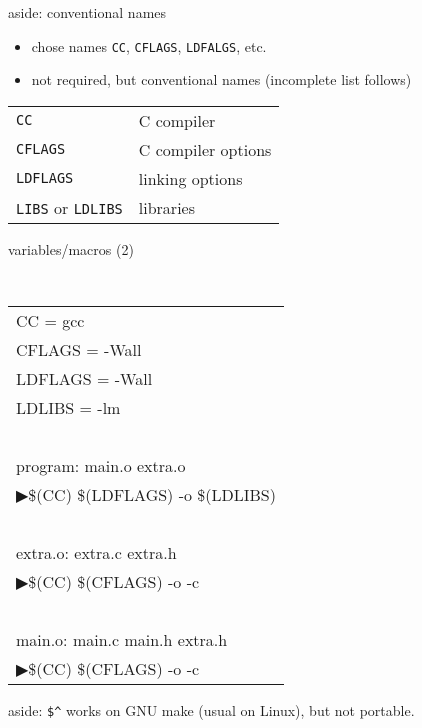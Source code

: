 \begin{frame}{aside: conventional names}
\begin{itemize}
\item chose names \texttt{CC}, \texttt{CFLAGS}, \texttt{LDFALGS}, etc.
\item not required, but conventional names (incomplete list follows)
\end{itemize}
\begin{tabular}{ll}
\texttt{CC} & C compiler \\
\texttt{CFLAGS} & C compiler options \\
\texttt{LDFLAGS} & linking options \\
\texttt{LIBS} or \texttt{LDLIBS} & libraries \\
\end{tabular}
\end{frame}

\begin{frame}{variables/macros (2)}

{\small\tt
\begin{tabular}{l}
CC = gcc \\
CFLAGS = -Wall \\
LDFLAGS = -Wall \\
LDLIBS = -lm \\
~ \\
program: main.o extra.o \\
▶\hspace{1.5cm}\$(CC) \$(LDFLAGS) -o \myemph{\$@} \myemph{\$\textasciicircum} \$(LDLIBS) \\
~ \\
extra.o: extra.c extra.h \\
▶\hspace{1.5cm}\$(CC) \$(CFLAGS) -o \myemph{\$@} -c \myemph{\$<} \\
~ \\
main.o: main.c main.h extra.h \\
▶\hspace{1.5cm}\$(CC) \$(CFLAGS) -o \myemph{\$@} -c \myemph{\$<} \\
\end{tabular}
}

{\small aside: \texttt{\$\textasciicircum} works on GNU make (usual on Linux), but not portable.}
\end{frame}


